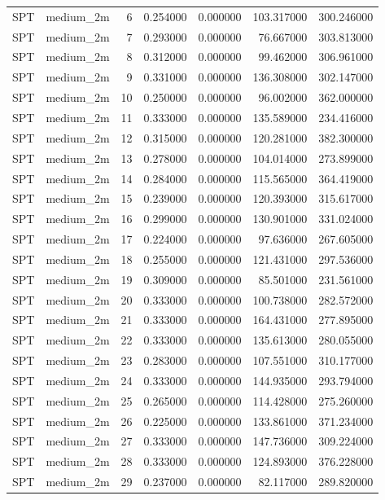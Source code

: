 \begin{tabular}{llrrrrr}
SPT & medium_2m & 6 & 0.254000 & 0.000000 & 103.317000 & 300.246000 \\
SPT & medium_2m & 7 & 0.293000 & 0.000000 & 76.667000 & 303.813000 \\
SPT & medium_2m & 8 & 0.312000 & 0.000000 & 99.462000 & 306.961000 \\
SPT & medium_2m & 9 & 0.331000 & 0.000000 & 136.308000 & 302.147000 \\
SPT & medium_2m & 10 & 0.250000 & 0.000000 & 96.002000 & 362.000000 \\
SPT & medium_2m & 11 & 0.333000 & 0.000000 & 135.589000 & 234.416000 \\
SPT & medium_2m & 12 & 0.315000 & 0.000000 & 120.281000 & 382.300000 \\
SPT & medium_2m & 13 & 0.278000 & 0.000000 & 104.014000 & 273.899000 \\
SPT & medium_2m & 14 & 0.284000 & 0.000000 & 115.565000 & 364.419000 \\
SPT & medium_2m & 15 & 0.239000 & 0.000000 & 120.393000 & 315.617000 \\
SPT & medium_2m & 16 & 0.299000 & 0.000000 & 130.901000 & 331.024000 \\
SPT & medium_2m & 17 & 0.224000 & 0.000000 & 97.636000 & 267.605000 \\
SPT & medium_2m & 18 & 0.255000 & 0.000000 & 121.431000 & 297.536000 \\
SPT & medium_2m & 19 & 0.309000 & 0.000000 & 85.501000 & 231.561000 \\
SPT & medium_2m & 20 & 0.333000 & 0.000000 & 100.738000 & 282.572000 \\
SPT & medium_2m & 21 & 0.333000 & 0.000000 & 164.431000 & 277.895000 \\
SPT & medium_2m & 22 & 0.333000 & 0.000000 & 135.613000 & 280.055000 \\
SPT & medium_2m & 23 & 0.283000 & 0.000000 & 107.551000 & 310.177000 \\
SPT & medium_2m & 24 & 0.333000 & 0.000000 & 144.935000 & 293.794000 \\
SPT & medium_2m & 25 & 0.265000 & 0.000000 & 114.428000 & 275.260000 \\
SPT & medium_2m & 26 & 0.225000 & 0.000000 & 133.861000 & 371.234000 \\
SPT & medium_2m & 27 & 0.333000 & 0.000000 & 147.736000 & 309.224000 \\
SPT & medium_2m & 28 & 0.333000 & 0.000000 & 124.893000 & 376.228000 \\
SPT & medium_2m & 29 & 0.237000 & 0.000000 & 82.117000 & 289.820000 \\

\end{tabular}
